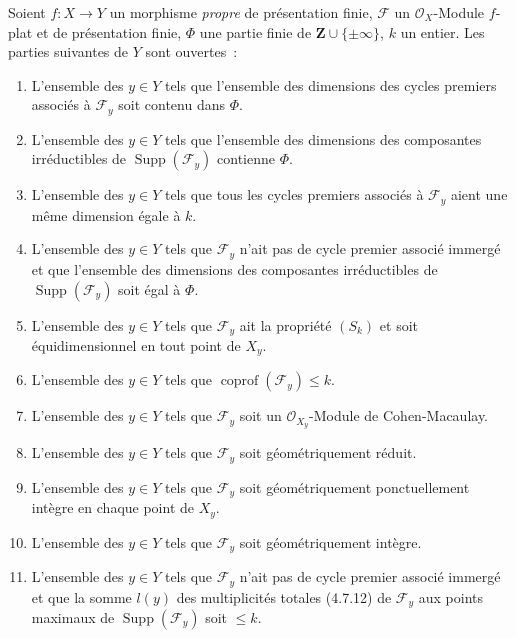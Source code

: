 \begin{theorem}[12.2.1]
\label{IV.12.2.1-fr}
Soient $f:X\to Y$ un morphisme \emph{propre} de présentation finie,
$\mathcal F$ un $\mathcal O_X$-Module $f$-plat et de présentation finie,
$\Phi$ une partie finie de $\mathbf Z\cup\{\pm\infty\}$, $k$ un entier. Les
parties suivantes de $Y$ sont ouvertes~:
\begin{enumerate}[label=(\roman*)]
  \item L'ensemble des $y\in Y$ tels que l'ensemble des dimensions des cycles
  premiers associés à $\mathcal F_y$ soit contenu dans $\Phi$.
  \item L'ensemble des $y\in Y$ tels que l'ensemble des dimensions des
  composantes irréductibles de $\operatorname{Supp}(\mathcal F_y)$ contienne
  $\Phi$.
  \item L'ensemble des $y\in Y$ tels que tous les cycles premiers associés à
  $\mathcal F_y$ aient une même dimension égale à $k$.
  \item L'ensemble des $y\in Y$ tels que $\mathcal F_y$ n'ait pas de cycle
  premier associé immergé et que l'ensemble des dimensions des composantes
  irréductibles de $\operatorname{Supp}(\mathcal F_y)$ soit égal à $\Phi$.
  \item L'ensemble des $y\in Y$ tels que $\mathcal F_y$ ait la propriété
  $(S_k)$ et soit équidimensionnel en tout point de $X_y$.
  \item L'ensemble des $y\in Y$ tels que
  $\operatorname{coprof}(\mathcal F_y)\leq k$.
  \item L'ensemble des $y\in Y$ tels que $\mathcal F_y$ soit un
  $\mathcal O_{X_y}$-Module de Cohen-Macaulay.
  \item L'ensemble des $y\in Y$ tels que $\mathcal F_y$ soit géométriquement
  réduit.
  \item L'ensemble des $y\in Y$ tels que $\mathcal F_y$ soit géométriquement
  ponctuellement intègre en chaque point de $X_y$.
  \item L'ensemble des $y\in Y$ tels que $\mathcal F_y$ soit géométriquement
  intègre.
  \item L'ensemble des $y\in Y$ tels que $\mathcal F_y$ n'ait pas de cycle
  premier associé immergé et que la somme $l(y)$ des multiplicités totales
  (4.7.12) de $\mathcal F_y$ aux points maximaux de
  $\operatorname{Supp}(\mathcal F_y)$ soit $\leq k$.
\end{enumerate}
\end{theorem}


